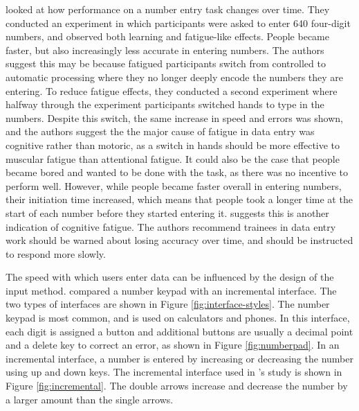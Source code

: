 \documentclass[11pt,oneside]{report}
\begin{document}
\citet{Healy2004} looked at how performance on a number entry task changes over time. They conducted an experiment in which participants were asked to enter 640 four-digit numbers, and observed both learning and fatigue-like effects. People became faster, but also increasingly less accurate in entering numbers. The authors suggest this may be because fatigued participants switch from controlled to automatic processing where they no longer deeply encode the numbers they are entering. To reduce fatigue effects, they conducted a second experiment where halfway through the experiment participants switched hands to type in the numbers. Despite this switch, the same increase in speed and errors was shown, and the authors suggest the the major cause of fatigue in data entry was cognitive rather than motoric, as a switch in hands should be more effective to muscular fatigue than attentional fatigue. It could also be the case that people became bored and wanted to be done with the task, as there was no incentive to perform well. However, while people became faster overall in entering numbers, their initiation time increased, which means that people took a longer time at the start of each number before they started entering it. \citet{Healy2004} suggests this is another indication of cognitive fatigue. 
The authors recommend trainees in data entry work should be warned about losing accuracy over time, and should be instructed to respond more slowly. 

The speed with which users enter data can be influenced by the design of the input method. \citet{Oladimeji2011} compared a number keypad with an incremental interface. The two types of interfaces are shown in Figure \ref{fig:interface-styles}. The number keypad is most common, and is used on calculators and phones. In this interface, each digit is assigned a button and additional buttons are usually a decimal point and a delete key to correct an error, as shown in Figure \ref{fig:numberpad}. In an incremental interface, a number is entered by increasing or decreasing the number using up and down keys. The incremental interface used in \citeauthor{Oladimeji2011}'s study is shown in Figure \ref{fig:incremental}. The double arrows increase and decrease the number by a larger amount than the single arrows.
\end{document}
